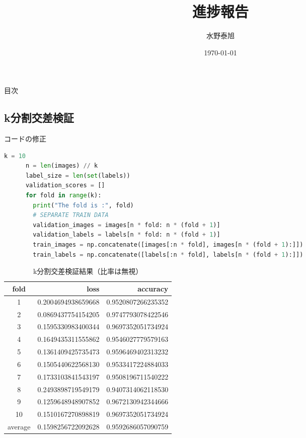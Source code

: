 \documentclass{beamer}
\title{進捗報告}
\date{\today}
\author{水野泰旭}
\institute{弘前大学理工学部電子情報工学科４年}
\begin{document}
  \maketitle
  
\begin{frame}{目次}
    \tableofcontents
  \end{frame}

  \begin{frame}
    \section{k分割交差検証}
  \end{frame}

  \begin{frame}[fragile]{コードの修正}
    \begin{lstlisting}[language=Python, caption=kseparate\_train.py, label=cd:keseparate_train.py]
      k = 10
      n = len(images) // k
      label_size = len(set(labels))
      validation_scores = []
      for fold in range(k):
        print("The fold is :", fold)
        # SEPARATE TRAIN DATA
        validation_images = images[n * fold: n * (fold + 1)]
        validation_labels = labels[n * fold: n * (fold + 1)]
        train_images = np.concatenate([images[:n * fold], images[n * (fold + 1):]])
        train_labels = np.concatenate([labels[:n * fold], labels[n * (fold + 1):]])
      \end{lstlisting}
  \end{frame}

  \begin{frame}
    \begin{table}[H]
      \centering
      \caption{k分割交差検証結果（比率は無視）}
      \begin{tabular}{crr}
        \toprule
        fold & loss & accuracy \\
        \midrule
        1 & 0.2004694938659668 & 0.9520807266235352 \\
        2 & 0.0869437754154205 & 0.9747793078422546 \\
        3 & 0.1595330983400344 & 0.9697352051734924 \\
        4 & 0.1649435311555862 & 0.9546027779579163 \\ 
        5 & 0.1361409425735473 & 0.9596469402313232 \\
        6 & 0.1505440622568130 & 0.9533417224884033 \\
        7 & 0.1733103841543197 & 0.9508196711540222 \\
        8 & 0.2493898719549179 & 0.9407314062118530 \\
        9 & 0.1259648948907852 & 0.9672130942344666 \\
        10 & 0.1510167270898819 & 0.9697352051734924 \\
        \midrule
        average & 0.1598256722092628 & 0.9592686057090759 \\
        \bottomrule
      \end{tabular}
    \end{table}
  \end{frame}
\end{document}
